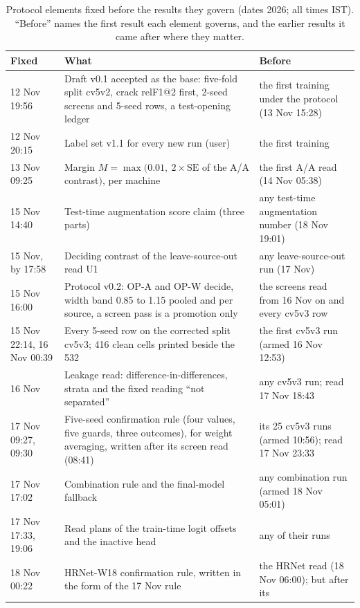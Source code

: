 \begin{table}[htbp]
\centering
\small
\caption{Protocol elements fixed before the results they govern (dates 2026; all times IST). ``Before'' names the first result
each element governs, and the earlier results it came after where they matter.}
\label{tab:build-before}
\begin{tabular}{@{}p{2.3cm}p{6.1cm}p{5.6cm}@{}}
\toprule
Fixed & What & Before \\
\midrule
12 Nov 19:56 & Draft v0.1 accepted as the base: five-fold split cv5v2, crack relF1@2 first, 2-seed screens and 5-seed rows, a
test-opening ledger & the first training under the protocol (13 Nov 15:28) \\
12 Nov 20:15 & Label set v1.1 for every new run (user) & the first training \\
13 Nov 09:25 & Margin $M=\max(0.01,\ 2\times\mathrm{SE}$ of the A/A contrast$)$, per machine & the first A/A read (14 Nov 05:38) \\
15 Nov 14:40 & Test-time augmentation score claim (three parts) & any test-time augmentation number (18 Nov 19:01) \\
15 Nov, by 17:58 & Deciding contrast of the leave-source-out read U1 & any leave-source-out run (17 Nov) \\
15 Nov 16:00 & Protocol v0.2: OP-A and OP-W decide, width band 0.85 to 1.15 pooled and per source, a screen pass is a promotion
only & the screens read from 16 Nov on and every cv5v3 row \\
15 Nov 22:14, 16 Nov 00:39 & Every 5-seed row on the corrected split cv5v3; 416 clean cells printed beside the 532 &
the first cv5v3 run (armed 16 Nov 12:53) \\
16 Nov & Leakage read: difference-in-differences, strata and the fixed reading ``not separated'' & any cv5v3 run; read 17 Nov 18:43 \\
17 Nov 09:27, 09:30 & Five-seed confirmation rule (four values, five guards, three outcomes), for weight averaging, written after
its screen read (08:41) & its 25 cv5v3 runs (armed 10:56); read 17 Nov 23:33 \\
17 Nov 17:02 & Combination rule and the final-model fallback & any combination run (armed 18 Nov 05:01) \\
17 Nov 17:33, 19:06 & Read plans of the train-time logit offsets and the inactive head & any of their runs \\
18 Nov 00:22 & HRNet-W18 confirmation rule, written in the form of the 17 Nov rule & the HRNet read (18 Nov 06:00); but after its

\end{tabular}
\end{table}
